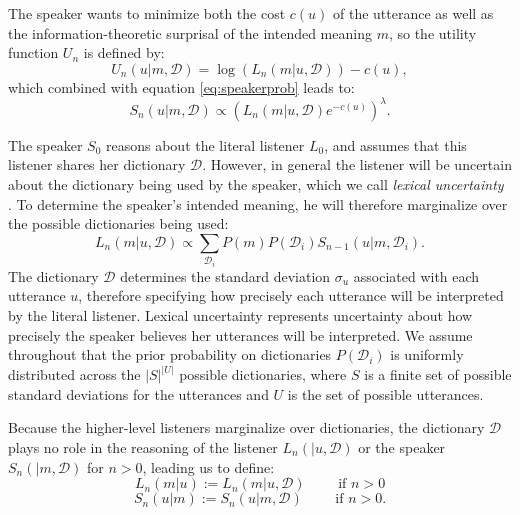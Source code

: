 \documentclass{article} %
\newcommand{\dictionary}{\ensuremath{\mathcal{D}}\xspace}
\begin{document}
The speaker wants to minimize both the cost $c(u)$ of the utterance as well as the information-theoretic surprisal of the intended meaning $m$, so the utility function $U_n$ is defined by:
\begin{equation}\label{eq:speakerutility}
U_n(u | m, \dictionary) = \log (L_{n}(m | u, \dictionary)) - c(u),
\end{equation}
which combined with equation \ref{eq:speakerprob} leads to:
\begin{equation}
S_n(u | m, \dictionary) \propto (L_{n}(m | u,\dictionary)e^{-c(u)}) ^\lambda.
\end{equation}

The speaker $S_0$ reasons about the literal listener $L_0$, and assumes that this listener shares her dictionary $\dictionary$. However, in general the listener will be uncertain about the dictionary being used by the speaker, which we call \emph{lexical uncertainty} \cite{bergen2012}. To determine the speaker's intended meaning, he will therefore marginalize over the possible dictionaries being used:
\begin{equation}
L_n(m|u,\dictionary) \propto \sum_{\dictionary_i }P(m)P(\dictionary_i)S_{n-1}(u | m,\dictionary_i).
\end{equation}
The dictionary $\dictionary$ determines the standard deviation $\sigma_u$ associated with each utterance $u$, therefore specifying how precisely each utterance will be interpreted by the literal listener. Lexical uncertainty represents uncertainty about how precisely the speaker believes her utterances will be interpreted. We assume throughout that the prior probability on dictionaries $P(\dictionary_i)$ is uniformly distributed across the $|S|^|U|$ possible dictionaries, where $S$ is a finite set of possible standard deviations for the utterances and $U$ is the set of possible utterances. 

Because the higher-level listeners marginalize over dictionaries, the dictionary $\dictionary$ plays no role in the reasoning of the listener $L_n(|u,\dictionary)$ or the speaker $S_n(| m, \dictionary)$ for $n>0$, leading us to define:
\begin{equation}
  L_n(m | u) :=  L_n(m | u, \dictionary) \text{ ~~~~~ if $n > 0$}
\end{equation}
\begin{equation}
  S_n(u | m) :=  S_n(u | m, \dictionary) \text{ ~~~~~ if $n > 0$.}
\end{equation}
\end{document}
